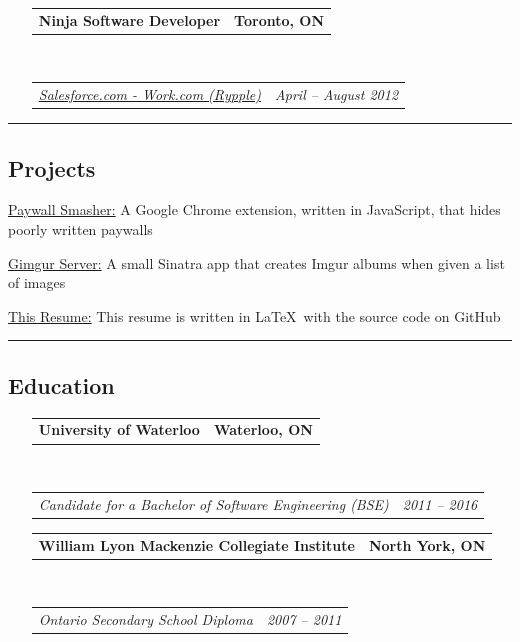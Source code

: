 \documentclass[10pt,letterpaper]{article}
\makeatletter
\newenvironment{indentsection}[1]%
{\begin{list}{}%
	{\setlength{\leftmargin}{#1}}%
	\item[]%
}
{\end{list}}
\newcommand{\headerrow}[2]
{\begin{tabular*}{\linewidth}{l@{\extracolsep{\fill}}r}
	#1 &
	#2 \\
\end{tabular*}}
\makeatother
\begin{document}
\begin{itemize}[leftmargin=*]
	\item[]
	\headerrow
		{\textbf{Ninja Software Developer}}
		{\textbf{Toronto, ON}}
	\\
	\headerrow
		{\emph{\href{https://www.work.com}{Salesforce.com - Work.com (Rypple)}}}
		{\emph{April -- August 2012}}
\end{itemize}

\hrule
\vspace{-0.4em}
\subsection*{Projects}
	\begin{indentsection}{\parindent}
	\begin{description*}
		\item[\href{https://github.com/Kapin/paywall-smasher}{Paywall Smasher:}] A Google Chrome extension, written in JavaScript, that hides poorly written paywalls
		\item[\href{https://github.com/Kapin/gimgur-server}{Gimgur Server:}] A small Sinatra app that creates Imgur albums when given a list of images
		\item[\href{https://github.com/kapin/resume}{This Resume:}] This resume is written in \LaTeX \ with the source code on GitHub
	\end{description*}
	\end{indentsection}

\hrule
\vspace{-0.4em}
\subsection*{Education}

\begin{itemize}[leftmargin=*]
	\parskip=0.1em

	\item[] 
	\headerrow
		{\textbf{University of Waterloo}}
		{\textbf{Waterloo, ON}}
	\\
	\headerrow
		{\emph{Candidate for a Bachelor of Software Engineering (BSE)}}
		{\emph{2011 -- 2016}}
		
	\item[] 
	\headerrow
		{\textbf{William Lyon Mackenzie Collegiate Institute}}
		{\textbf{North York, ON}}
	\\
	\headerrow
		{\emph{Ontario Secondary School Diploma}}
		{\emph{2007 -- 2011}}

\end{itemize}
\end{document}
